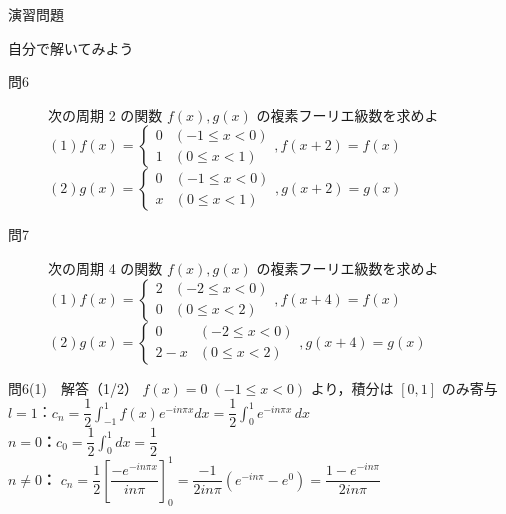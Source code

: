 \documentclass[professionalfonts]{beamer}
\begin{document}
\begin{frame}{演習問題}
  \begin{exampleblock}{自分で解いてみよう}
  \begin{description}
    \item[問6] 次の周期 2 の関数 $f(x), g(x)$ の複素フーリエ級数を求めよ
    $(1) f(x) = \begin{cases} 0 & (-1 \leq x < 0) \\ 1 & (0 \leq x < 1) \end{cases},  f(x+2) = f(x)$\\
    $(2) g(x) = \begin{cases} 0 & (-1 \leq x < 0) \\ x & (0 \leq x < 1) \end{cases},  g(x+2) = g(x)$\\
    \item[問7] 次の周期 4 の関数 $f(x), g(x)$ の複素フーリエ級数を求めよ
    $(1) f(x) = \begin{cases} 2 & (-2 \leq x < 0) \\ 0 & (0 \leq x < 2) \end{cases},  f(x+4) = f(x)$\\
    $(2) g(x) = \begin{cases} 0 & (-2 \leq x < 0) \\ 2-x & (0 \leq x < 2) \end{cases},  g(x+4) = g(x)$\\
  \end{description}
  \end{exampleblock}
\end{frame}

\begin{frame}{問6(1)　解答（1/2）}
  $f(x)=0\;(-1\leq x<0)$ より，積分は $[0,1]$ のみ寄与\\[4pt]
  $l=1$：$c_{n} = \dfrac{1}{2}\displaystyle\int_{-1}^{1}f(x)e^{-in\pi x}dx
    = \dfrac{1}{2}\displaystyle\int_{0}^{1}e^{-in\pi x}\,dx$\\[6pt]
  \textbf{$n=0$：}$c_{0} = \dfrac{1}{2}\displaystyle\int_{0}^{1}dx = \dfrac{1}{2}$\\[6pt]
  \textbf{$n\neq 0$：}
  $c_{n} = \dfrac{1}{2}\!\left[\dfrac{-e^{-in\pi x}}{in\pi}\right]_{0}^{1}
    = \dfrac{-1}{2in\pi}\!\left(e^{-in\pi}-e^{0}\right)
    = \dfrac{1-e^{-in\pi}}{2in\pi}$
\end{frame}
\end{document}
